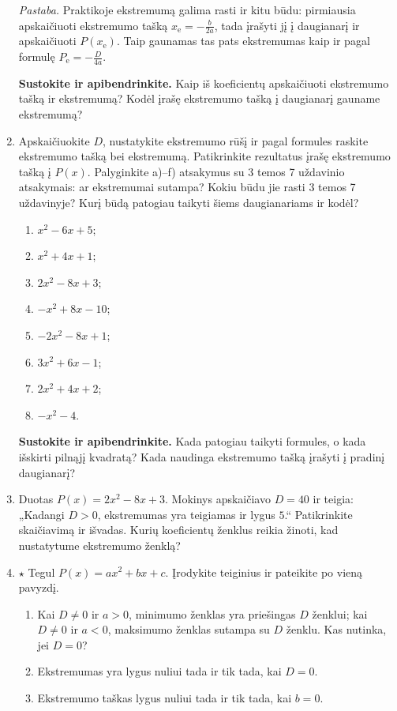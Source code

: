 \documentclass[12pt,a4paper]{article}
\begin{document}
\begin{enumerate}
\textit{Pastaba.} Praktikoje ekstremumą galima rasti ir kitu būdu: pirmiausia apskaičiuoti ekstremumo tašką $x_{\mathrm e}=-\frac{b}{2a}$, tada įrašyti jį į daugianarį ir apskaičiuoti $P(x_{\mathrm e})$. Taip gaunamas tas pats ekstremumas kaip ir pagal formulę $P_{\mathrm e}=-\frac{D}{4a}$.
\par\medskip
\textbf{Sustokite ir apibendrinkite.} Kaip iš koeficientų apskaičiuoti ekstremumo tašką ir ekstremumą? Kodėl įrašę ekstremumo tašką į daugianarį gauname ekstremumą?
\item Apskaičiuokite $D$, nustatykite ekstremumo rūšį ir pagal formules raskite ekstremumo tašką bei ekstremumą. Patikrinkite rezultatus įrašę ekstremumo tašką į $P(x)$. Palyginkite a)–f) atsakymus su 3 temos 7 uždavinio atsakymais: ar ekstremumai sutampa? Kokiu būdu jie rasti 3 temos 7 uždavinyje? Kurį būdą patogiau taikyti šiems daugianariams ir kodėl?
\begin{multicols}{2}\begin{enumerate}
\item $x^2-6x+5$; \item $x^2+4x+1$; \item $2x^2-8x+3$; \item $-x^2+8x-10$; \item $-2x^2-8x+1$; \item $3x^2+6x-1$; \item $2x^2+4x+2$; \item $-x^2-4$.
\end{enumerate}\end{multicols}
\par\medskip
\textbf{Sustokite ir apibendrinkite.} Kada patogiau taikyti formules, o kada išskirti pilnąjį kvadratą? Kada naudinga ekstremumo tašką įrašyti į pradinį daugianarį?
\item Duotas $P(x)=2x^2-8x+3$. Mokinys apskaičiavo $D=40$ ir teigia: „Kadangi $D>0$, ekstremumas yra teigiamas ir lygus $5$.“ Patikrinkite skaičiavimą ir išvadas. Kurių koeficientų ženklus reikia žinoti, kad nustatytume ekstremumo ženklą?
\item $\star$ Tegul $P(x)=ax^2+bx+c$. Įrodykite teiginius ir pateikite po vieną pavyzdį.
\begin{enumerate}
\item Kai $D\ne0$ ir $a>0$, minimumo ženklas yra priešingas $D$ ženklui; kai $D\ne0$ ir $a<0$, maksimumo ženklas sutampa su $D$ ženklu. Kas nutinka, jei $D=0$?
\item Ekstremumas yra lygus nuliui tada ir tik tada, kai $D=0$.
\item Ekstremumo taškas lygus nuliui tada ir tik tada, kai $b=0$.

\end{enumerate}
\end{enumerate}
\end{document}
